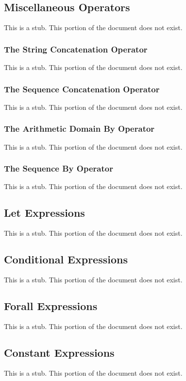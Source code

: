 \subsection{Miscellaneous Operators}
\label{Miscellaneous_Operators}

This is a stub.  This portion of the document does not exist.

\subsubsection{The String Concatenation Operator}
\label{The_String_Concatenation_Operator}

This is a stub.  This portion of the document does not exist.

\subsubsection{The Sequence Concatenation Operator}
\label{The_Sequence_Concatenation_Operator}

This is a stub.  This portion of the document does not exist.

\subsubsection{The Arithmetic Domain By Operator}
\label{The_Arithmetic_Domain_By_Operator}

This is a stub.  This portion of the document does not exist.

\subsubsection{The Sequence By Operator}
\label{The_Sequence_By_Operator}

This is a stub.  This portion of the document does not exist.

\subsection{Let Expressions}
\label{Let_Expressions}

This is a stub.  This portion of the document does not exist.

\subsection{Conditional Expressions}
\label{Conditional_Expressions}

This is a stub.  This portion of the document does not exist.

\subsection{Forall Expressions}
\label{Forall_Expressions}

This is a stub.  This portion of the document does not exist.

\subsection{Constant Expressions}
\label{Constant_Expressions}

This is a stub.  This portion of the document does not exist.
